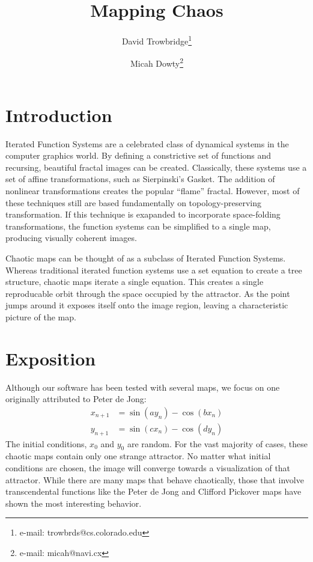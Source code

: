 \documentclass{acmsiggraph}
\title{Mapping Chaos}
\author{
  David Trowbridge\thanks{e-mail: trowbrds@cs.colorado.edu}
\and
  Micah Dowty\thanks{e-mail: micah@navi.cx}
}
\begin{document}
\maketitle

\section{Introduction}
\copyrightspace
Iterated Function Systems are a celebrated class of dynamical systems in the
computer graphics world. By defining a constrictive set of functions and
recursing, beautiful fractal images can be created. Classically, these
systems use a set of affine transformations, such as Sierpinski's Gasket.
The addition of nonlinear transformations creates the popular ``flame''
fractal. However, most of these techniques still are based fundamentally
on topology-preserving transformation. If this technique is exapanded to
incorporate space-folding transformations, the function systems can be
simplified to a single map, producing visually coherent images.

Chaotic maps can be thought of as a subclass of Iterated Function Systems.
Whereas traditional iterated function systems use a set equation to create
a tree structure, chaotic maps iterate a single equation. This creates a
single reproducable orbit through the space occupied by the attractor. As
the point jumps around it exposes itself onto the image region, leaving
a characteristic picture of the map.

\section{Exposition}
Although our software has been tested with several maps, we focus on one
originally attributed to Peter de Jong:
\begin{eqnarray*}
  x_{n+1} &= \sin (a y_n) - \cos (b x_n) \\
  y_{n+1} &= \sin (c x_n) - \cos (d y_n)
\end{eqnarray*}
The initial conditions, $x_0$ and $y_0$ are random. For the vast majority
of cases, these chaotic maps contain only one strange attractor. No matter
what initial conditions are chosen, the image will converge towards a
visualization of that attractor. While there are many maps that behave
chaotically, those that involve transcendental functions like the Peter
de Jong and Clifford Pickover maps have shown the most interesting behavior.
\end{document}
